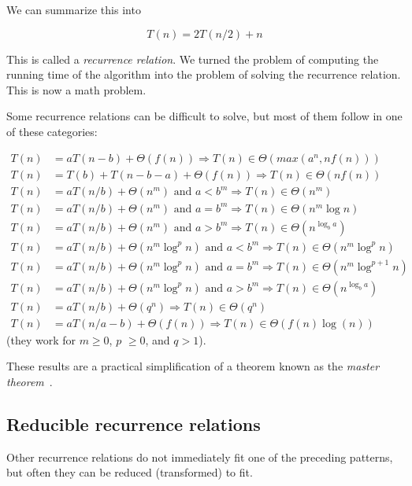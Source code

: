 \documentclass[justified,sixbynine]{tufte-book}
\theoremstyle{plain}%
\theoremstyle{definition}
\theoremstyle{remark}
\begin{document}
\begin{fullwidth}
We can summarize this into

\begin{equation}
T(n) = 2T(n/2) + n
\end{equation}

This is called a {\it recurrence relation}. We turned the problem of computing the running time of the algorithm into the problem of solving the recurrence relation. This is now a math problem.

Some recurrence relations can be difficult to solve, but most of them follow in one of these categories:

\begin{align}
T(n)  &= aT(n-b)+\Theta (f(n))\Rightarrow T(n)\in \Theta (max(a^n,nf(n))) \\
T(n)  &= T(b)+T(n-b-a)+\Theta(f(n))\Rightarrow T(n)\in \Theta (nf(n)) \\
T(n)  &= aT(n/b)+\Theta (n^m)\text{ and }a<b^m\Rightarrow T(n)\in \Theta (n^m) \\
T(n)  &=aT(n/b)+\Theta (n^m)\text{ and }a=b^m\Rightarrow T(n)\in \Theta
(n^m\log n) \\
T(n)  &= aT(n/b)+\Theta (n^m)\text{ and }a>b^m\Rightarrow T(n)\in \Theta
(n^{\log _ba}) \\
T(n)  &= aT(n/b)+\Theta (n^m\log ^pn)\text{ and }a<b^m\Rightarrow T(n)\in
\Theta (n^m\log ^pn) \\
T(n)  &= aT(n/b)+\Theta (n^m\log ^pn)\text{ and }a=b^m\Rightarrow T(n)\in
\Theta (n^m\log ^{p+1}n) \\
T(n)  &= aT(n/b)+\Theta (n^m\log ^pn)\text{ and }a>b^m\Rightarrow T(n)\in
\Theta (n^{\log _ba}) \\
T(n)  &= aT(n/b)+\Theta (q^n)\Rightarrow T(n)\in \Theta (q^n) \\
T(n)  &= aT(n/a-b)+\Theta (f(n)) \Rightarrow T(n)\in \Theta (f(n)\log(n))
\end{align}
(they work for $m\geq 0$, $p$ $\geq 0$, and $q>1$).


These results are a practical simplification of a theorem known as the {\it master theorem}~\cite{mastertheorem}.

\goodbreak\subsection{Reducible recurrence relations}

Other recurrence relations do not immediately fit one of the preceding patterns, but often they can be reduced (transformed) to fit.


\end{fullwidth}
\end{document}
